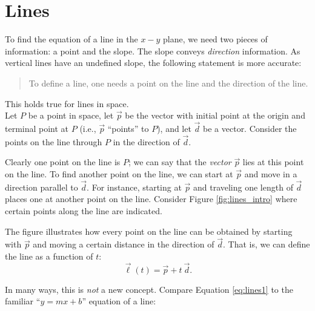 \section{Lines}\label{sec:lines}

To find the equation of a line in the $x-y$ plane, we need two pieces of information: a point and the slope. The slope conveys \textit{direction} information. As vertical lines have an undefined slope, the following statement is more accurate:

\begin{quotation}
\noindent To define a line, one needs a point on the line and the direction of the line.
\end{quotation}

This holds true for lines in space.\\

Let $P$ be a point in space, let $\vec p$ be the vector with initial point at the origin and terminal point at $P$ (i.e., $\vec p$ ``points'' to $P$), and let $\vec d$ be a vector. Consider the points on the line through $P$ in the direction of $\vec d$. 

Clearly one point on the line is $P$; we can say that the \emph{vector} $\vec p$ lies at this point on the line. To find another point on the line, we can start at $\vec p$ and move in a  direction parallel to $\vec d$. For instance, starting at $\vec p$ and traveling one length of $\vec d$ places one at another point on the line. Consider Figure \ref{fig:lines_intro} where certain points along the line are indicated. 

The figure illustrates how every point on the line can be obtained by starting with $\vec p$ and moving a certain distance in the direction of $\vec d$. That is, we can define the line as a function of $t$:
\begin{equation}\vec\ell(t) = \vec p + t\ \vec d.\label{eq:lines1}\end{equation}

In many ways, this is \textit{not} a new concept. Compare Equation \eqref{eq:lines1} to the familiar ``$y=mx+b$'' equation of a line:


